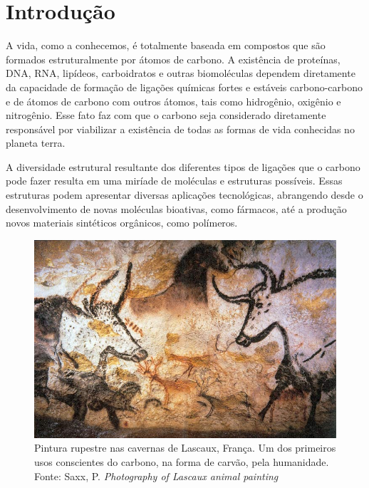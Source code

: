 

\chapter{Introdução}\label{intro}

	A vida, como a conhecemos, é totalmente baseada em compostos que são formados estruturalmente por átomos de carbono.  A existência de proteínas, DNA, RNA, lipídeos, carboidratos e outras biomoléculas dependem diretamente da capacidade de formação de ligações químicas fortes e estáveis carbono-carbono e de átomos de carbono com outros átomos, tais como hidrogênio, oxigênio e nitrogênio. Esse fato faz com que o carbono seja considerado diretamente responsável por viabilizar a existência de todas as formas de vida conhecidas no planeta terra.\cite{nelson2008lehninger}
	
	A diversidade estrutural resultante dos diferentes tipos de ligações que o carbono pode fazer resulta em uma miríade de moléculas e estruturas possíveis. Essas estruturas podem apresentar diversas aplicações tecnológicas, abrangendo desde o desenvolvimento de novas moléculas bioativas, como fármacos, até a produção novos materiais sintéticos orgânicos, como polímeros. 

	\begin{figure}[h!]
		\centering
		\includegraphics[width=.7\linewidth]{capitulos/fig/intro/Lascaux_painting.jpg}
		\caption{Pintura rupestre nas cavernas de Lascaux, França. Um dos primeiros usos conscientes do carbono, na forma de carvão, pela humanidade. Fonte: Saxx, P. \textit{Photography of Lascaux animal painting}}
		\label{Lascaux_painting}
	\end{figure}

